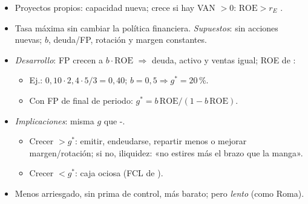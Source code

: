 \documentclass{article}
\begin{document}
\begin{columnas}
\begin{itemize}
\item Proyectos propios: capacidad nueva; crece si hay VAN $>0$: $\mathrm{ROE}>r_E$ .
\end{itemize}
\begin{itemize}
\item Tasa máxima sin cambiar la política financiera. \emph{Supuestos}: sin acciones nuevas; $b$, deuda/FP, rotación y margen constantes.
\item \emph{Desarrollo}: FP crecen a $b\cdot\mathrm{ROE}$ $\Rightarrow$ deuda, activo y ventas igual; ROE de  :
  \begin{itemize}
  \item Ej.: $0{,}10\cdot2{,}4\cdot5/3=0{,}40$; $b=0{,}5\Rightarrow g^*=20$\,\%.
  \item Con FP de final de periodo: $g^*=b\,\mathrm{ROE}/(1-b\,\mathrm{ROE})$.
  \end{itemize}
\item \emph{Implicaciones}: misma $g$ que -.
  \begin{itemize}
  \item Crecer $>g^*$: emitir, endeudarse, repartir menos o mejorar margen/rotación; si no, iliquidez: «no estires más el brazo que la manga».
  \item Crecer $<g^*$: caja ociosa (FCL de ).
  \end{itemize}
\end{itemize}
\begin{itemize}
\item Menos arriesgado, sin prima de control, más barato; pero \emph{lento} (como Roma).
\end{itemize}


\end{columnas}
\end{document}

